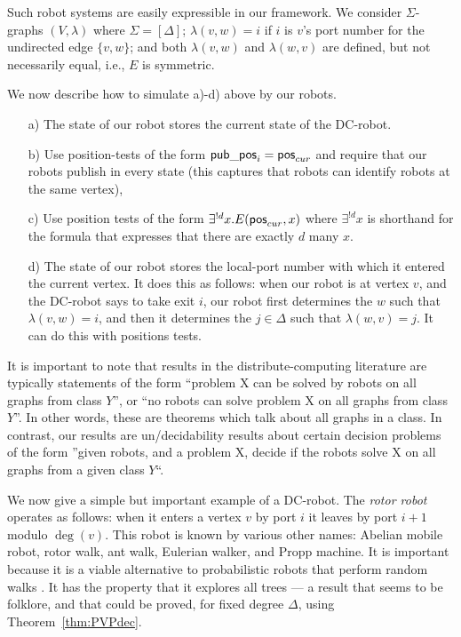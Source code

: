 Such robot systems are easily expressible in our framework. We consider $\Sigma$-graphs $(V,\lambda)$ where
$\Sigma = [\Delta]$;
$\lambda(v,w) = i$ if $i$ is $v$'s port number for the undirected edge $\{v,w\}$; and
both $\lambda(v,w)$ and $\lambda(w,v)$ are defined, but not necessarily equal, i.e., $E$ is symmetric.

We now describe how to simulate a)-d) above by our robots.
\begin{itemize}
 \item[a)] The state of our robot stores the current state of the DC-robot.
 \item[b)] Use position-tests of the form $\mathsf{pub\_pos}_i = \mathsf{pos}_{cur}$ and require that our robots publish in every state (this captures that robots can identify robots at the same vertex),
 \item[c)] Use position tests of the form $\exists^{!d} x. E(\mathsf{pos}_{cur},x)$ where $\exists^{!d} x$ is shorthand for the formula that expresses that there are exactly $d$ many $x$. 
 \item[d)] The state of our robot stores the local-port number with which it entered the current vertex. It does this as follows: when our robot is at vertex $v$, and the DC-robot says to take exit $i$, our robot first determines the $w$ such that $\lambda(v,w) = i$, and then it determines the $j \in \Delta$ such that $\lambda(w,v) = j$. It can do this with positions tests.
\end{itemize}

It is important to note that results in the distribute-computing literature are typically statements of the form ``problem X can be solved by robots on all graphs from class $Y$'', or ``no robots can solve problem X on all graphs from class $Y$''. In other words, these are theorems which talk about all graphs in a class. In contrast, our results are un/decidability results about certain decision problems of the form ''given robots, and a problem X, decide if the robots solve X on all graphs from a given class $Y$``.


\begin{example}
We now give a simple but important example of a DC-robot. The {\em rotor robot} operates as follows: when it enters a vertex $v$ by port $i$ it leaves by port $i+1$ modulo $\deg(v)$. This robot is known by various other names: Abelian mobile robot, rotor walk, ant walk, Eulerian walker, and Propp machine. It is important because it is a viable alternative to probabilistic robots that perform random walks \cite{BL13}. It has the property that it explores all trees --- a result that seems to be folklore, and that could be proved, for fixed degree $\Delta$, using Theorem~\ref{thm:PVPdec}.
\end{example}

